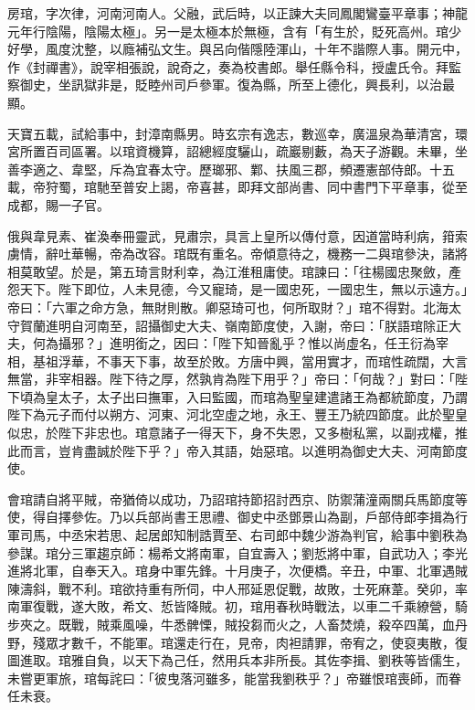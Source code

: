 
\begin{pinyinscope}

 房琯，字次律，河南河南人。父融，武后時，以正諫大夫同鳳閣鸞臺平章事；神龍元年行陰陽，陰陽太極」。另一是太極本於無極，含有「有生於，貶死高州。琯少好學，風度沈整，以廕補弘文生。與呂向偕隱陸渾山，十年不諧際人事。開元中，作《封禪書》，說宰相張說，說奇之，奏為校書郎。舉任縣令科，授盧氏令。拜監察御史，坐訊獄非是，貶睦州司戶參軍。復為縣，所至上德化，興長利，以治最顯。



 天寶五載，試給事中，封漳南縣男。時玄宗有逸志，數巡幸，廣溫泉為華清宮，環宮所置百司區署。以琯資機算，詔總經度驪山，疏巖剔藪，為天子游觀。未畢，坐善李適之、韋堅，斥為宜春太守。歷瑯邪、鄴、扶風三郡，頻遷憲部侍郎。十五載，帝狩蜀，琯馳至普安上謁，帝喜甚，即拜文部尚書、同中書門下平章事，從至成都，賜一子官。



 俄與韋見素、崔渙奉冊靈武，見肅宗，具言上皇所以傳付意，因道當時利病，箝索虜情，辭吐華暢，帝為改容。琯既有重名。帝傾意待之，機務一二與琯參決，諸將相莫敢望。於是，第五琦言財利幸，為江淮租庸使。琯諫曰：「往楊國忠聚斂，產怨天下。陛下即位，人未見德，今又寵琦，是一國忠死，一國忠生，無以示遠方。」帝曰：「六軍之命方急，無財則散。卿惡琦可也，何所取財？」琯不得對。北海太守賀蘭進明自河南至，詔攝御史大夫、嶺南節度使，入謝，帝曰：「朕語琯除正大夫，何為攝邪？」進明銜之，因曰：「陛下知晉亂乎？惟以尚虛名，任王衍為宰相，基祖浮華，不事天下事，故至於敗。方唐中興，當用實才，而琯性疏闊，大言無當，非宰相器。陛下待之厚，然孰肯為陛下用乎？」帝曰：「何哉？」對曰：「陛下頃為皇太子，太子出曰撫軍，入曰監國，而琯為聖皇建遣諸王為都統節度，乃謂陛下為元子而付以朔方、河東、河北空虛之地，永王、豐王乃統四節度。此於聖皇似忠，於陛下非忠也。琯意諸子一得天下，身不失恩，又多樹私黨，以副戎權，推此而言，豈肯盡誠於陛下乎？」帝入其語，始惡琯。以進明為御史大夫、河南節度使。



 會琯請自將平賊，帝猶倚以成功，乃詔琯持節招討西京、防禦蒲潼兩關兵馬節度等使，得自擇參佐。乃以兵部尚書王思禮、御史中丞鄧景山為副，戶部侍郎李揖為行軍司馬，中丞宋若思、起居郎知制誥賈至、右司郎中魏少游為判官，給事中劉秩為參謀。琯分三軍趨京師：楊希文將南軍，自宜壽入；劉悊將中軍，自武功入；李光進將北軍，自奉天入。琯身中軍先鋒。十月庚子，次便橋。辛丑，中軍、北軍遇賊陳濤斜，戰不利。琯欲持重有所伺，中人邢延恩促戰，故敗，士死麻葦。癸卯，率南軍復戰，遂大敗，希文、悊皆降賊。初，琯用春秋時戰法，以車二千乘繚營，騎步夾之。既戰，賊乘風噪，牛悉髀慄，賊投芻而火之，人畜焚燒，殺卒四萬，血丹野，殘眾才數千，不能軍。琯還走行在，見帝，肉袒請罪，帝宥之，使裒夷散，復圖進取。琯雅自負，以天下為己任，然用兵本非所長。其佐李揖、劉秩等皆儒生，未嘗更軍旅，琯每詫曰：「彼曳落河雖多，能當我劉秩乎？」帝雖恨琯喪師，而眷任未衰。




\end{pinyinscope}
